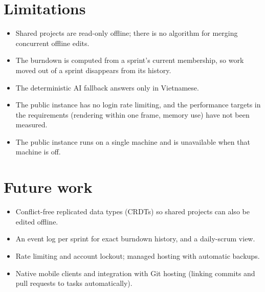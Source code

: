 \documentclass[../main.tex]{subfiles}
\begin{document}
\section*{Limitations}
\begin{itemize}
  \item Shared projects are read-only offline; there is no algorithm for merging concurrent offline
        edits.
  \item The burndown is computed from a sprint's current membership, so work moved out of a sprint
        disappears from its history.
  \item The deterministic AI fallback answers only in Vietnamese.
  \item The public instance has no login rate limiting, and the performance targets in the
        requirements (rendering within one frame, memory use) have not been measured.
  \item The public instance runs on a single machine and is unavailable when that machine is off.
\end{itemize}

\section*{Future work}
\begin{itemize}
  \item Conflict-free replicated data types (CRDTs) so shared projects can also be edited offline.
  \item An event log per sprint for exact burndown history, and a daily-scrum view.
  \item Rate limiting and account lockout; managed hosting with automatic backups.
  \item Native mobile clients and integration with Git hosting (linking commits and pull requests
        to tasks automatically).
\end{itemize}
\end{document}
